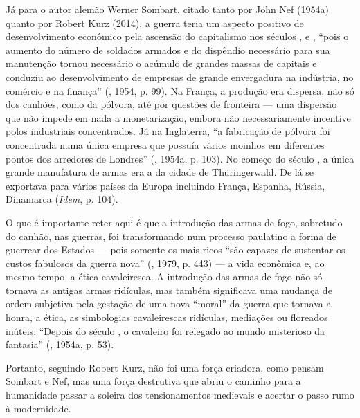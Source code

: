 Já para o autor alemão Werner Sombart, citado tanto por John Nef (1954a)
quanto por Robert Kurz (2014), a guerra teria um aspecto positivo de
desenvolvimento econômico pela ascensão do capitalismo nos séculos ,
 e , ``pois o aumento do número de soldados armados e do
dispêndio necessário para sua manutenção tornou necessário o acúmulo de
grandes massas de capitais e conduziu ao desenvolvimento de empresas de
grande envergadura na indústria, no comércio e na finança'' (, 1954,
p. 99). Na França, a produção era dispersa, não só dos canhões, como da
pólvora, até por questões de fronteira --- uma dispersão que não impede
em nada a monetarização, embora não necessariamente incentive polos
industriais concentrados. Já na Inglaterra, ``a fabricação de pólvora
foi concentrada numa única empresa que possuía vários moinhos em
diferentes pontos dos arredores de Londres'' (, 1954a, p. 103). No
começo do século , a única grande manufatura de armas era a da
cidade de Thüringerwald. De lá se exportava para vários países da Europa
incluindo França, Espanha, Rússia, Dinamarca (\emph{Idem}, p. 104).

O que é importante reter aqui é que a introdução das armas de fogo,
sobretudo do canhão, nas guerras, foi transformando num processo
paulatino a forma de guerrear dos Estados --- pois somente os mais ricos
``são capazes de sustentar os custos fabulosos da guerra nova''
(, 1979, p. 443) --- a vida econômica e, ao mesmo tempo, a ética
cavaleiresca. A introdução das armas de fogo não só tornava as antigas
armas ridículas, mas também significava uma mudança de ordem subjetiva
pela gestação de uma nova ``moral'' da guerra que tornava a honra, a
ética, as simbologias cavaleirescas ridículas, mediações ou floreados
inúteis: ``Depois do século , o cavaleiro foi relegado ao mundo
misterioso da fantasia'' (, 1954a, p. 53).

Portanto, seguindo Robert Kurz, não foi uma força criadora, como pensam Sombart e Nef, mas uma força destrutiva que abriu o caminho para a
humanidade passar a soleira dos tensionamentos medievais e acertar o
passo rumo à modernidade.

